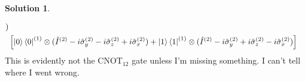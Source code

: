 \documentclass[10pt]{article}
\theoremstyle{definition}
\newtheorem{soln}{Solution}
\begin{document}
\begin{soln}
\begin{enumerate}[label=(\alph*)]
\begin{align*}
            )                                                                                                                                                                                                                                          \\
             & \left[\ket{0}\bra{0}^{(1)}\otimes(\hat{I}^{(2)}-i\hat{\sigma}_y^{(2)}-i\hat{\sigma}_z^{(2)}+i\hat{\sigma}_x^{(2)})+ \ket{1}\bra{1}^{(1)}\otimes(\hat{I}^{(2)}-i\hat{\sigma}_y^{(2)}+i\hat{\sigma}_z^{(2)}-i\hat{\sigma}_x^{(2)})\right]
          \end{align*}
          This is evidently not the $\text{CNOT}_{12}$ gate unless I'm missing something. I can't tell where I went wrong.



\end{enumerate}
\end{soln}
\end{document}
